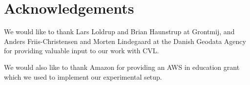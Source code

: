 \section{Acknowledgements}
We would like to thank Lars Loldrup and Brian Haunstrup at Grontmij, and Anders Friis-Christensen and Morten Lindegaard at the Danish Geodata Agency for providing valuable input to our work with CVL.

We would also like to thank Amazon for providing an AWS in education grant which we used to implement our experimental setup.